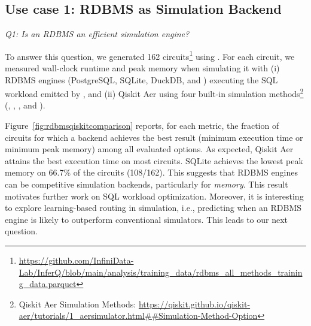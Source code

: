 \subsection{Use case 1: RDBMS as Simulation Backend}
\label{ssec:simu}
\emph{Q1: Is an RDBMS an efficient simulation engine?}

To answer this question, we generated 162 circuits\footnote{\url{https://github.com/InfiniData-Lab/InferQ/blob/main/analysis/training_data/rdbms_all_methods_training_data.parquet}} using \sys. For each circuit, we
measured wall-clock runtime and peak memory when simulating it with (i) 
RDBMS engines (PostgreSQL, SQLite, DuckDB, and ) executing the SQL workload emitted by
\sys, and (ii) Qiskit Aer using four built-in simulation methods\footnote{Qiskit Aer Simulation Methods: \url{https://qiskit.github.io/qiskit-aer/tutorials/1_aersimulator.html##Simulation-Method-Option}}
(, , , and
).


Figure~\ref{fig:rdbmsqiskitcomparison} reports, for each metric, the fraction of circuits
for which a backend achieves the best result (minimum execution time or minimum peak
memory) among all evaluated options. As expected, Qiskit Aer attains the best execution
time on most circuits. 
SQLite
achieves the lowest peak memory on 66.7\% of the circuits (108/162). This suggests that
RDBMS engines can be competitive simulation backends, particularly for \emph{memory}. This result 
motivates  further work on SQL workload optimization. 
Moreover, it is interesting to explore learning-based routing in simulation, i.e., predicting when an RDBMS engine is likely to outperform conventional simulators. This leads to our next question.

 
 


